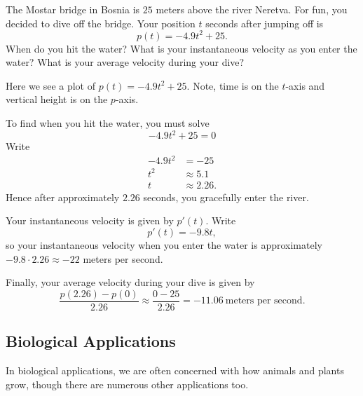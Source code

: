 \begin{example}
The Mostar bridge in Bosnia is $25$ meters above the river
Neretva. For fun, you decided to dive off the bridge. Your position
$t$ seconds after jumping off is
\[
p(t) = -4.9t^2 + 25.
\]
When do you hit the water? What is your instantaneous velocity as you
enter the water?  What is your average velocity during your dive?
\end{example}
\begin{marginfigure}
\caption{Here we see a plot of $p(t) = -4.9t^2 + 25$. Note, time is on
  the $t$-axis and vertical height is on the $p$-axis.}
\end{marginfigure}
\begin{solution}
To find when you hit the water, you must solve
\[
-4.9t^2 + 25 = 0
\]
Write
\begin{align*}
-4.9t^2 &= -25 \\
t^2 &\approx 5.1 \\ 
t &\approx 2.26.
\end{align*}
Hence after approximately $2.26$ seconds, you gracefully enter the
river.

Your instantaneous velocity is given by $p'(t)$. Write
\[
p'(t) = -9.8t,
\]
so your instantaneous velocity when you enter the water is
approximately $-9.8\cdot 2.26\approx -22$ meters per second.

Finally, your average velocity during your dive is given by
\[
\frac{p(2.26) -p(0)}{2.26} \approx \frac{0-25}{2.26} =
-11.06~\text{meters per second}.
\]
\end{solution}





\subsection*{Biological Applications}

In biological applications, we are often concerned with how animals
and plants grow, though there are numerous other applications too.

